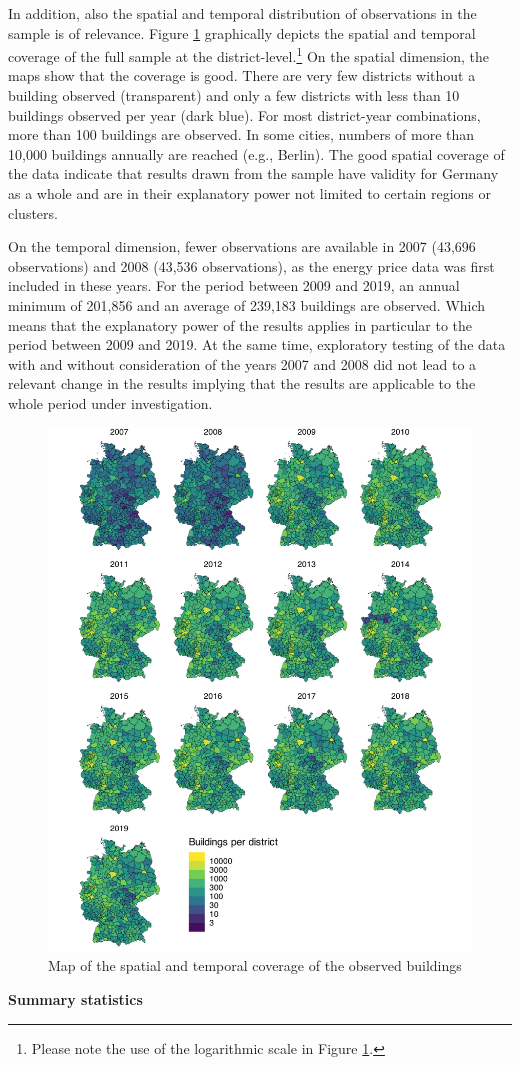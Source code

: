 \documentclass[12pt,twoside]{reedthesis}
\begin{document}
In addition, also the spatial and temporal distribution of observations in the sample is of relevance. Figure \ref{fig:buildings-distribution} graphically depicts the spatial and temporal coverage of the full sample at the district-level.\footnote{Please note the use of the logarithmic scale in Figure \ref{fig:buildings-distribution}.} On the spatial dimension, the maps show that the coverage is good. There are very few districts without a building observed (transparent) and only a few districts with less than 10 buildings observed per year (dark blue). For most district-year combinations, more than 100 buildings are observed. In some cities, numbers of more than 10,000 buildings annually are reached (e.g., Berlin). The good spatial coverage of the data indicate that results drawn from the sample have validity for Germany as a whole and are in their explanatory power not limited to certain regions or clusters.

On the temporal dimension, fewer observations are available in 2007 (43,696 observations) and 2008 (43,536 observations), as the energy price data was first included in these years. For the period between 2009 and 2019, an annual minimum of 201,856 and an average of 239,183 buildings are observed. Which means that the explanatory power of the results applies in particular to the period between 2009 and 2019. At the same time, exploratory testing of the data with and without consideration of the years 2007 and 2008 did not lead to a relevant change in the results implying that the results are applicable to the whole period under investigation.
\begin{figure}

{\centering \includegraphics[width=0.77\linewidth]{figure/buildings_distribution} 

}

\caption{Map of the spatial and temporal coverage of the observed buildings}\label{fig:buildings-distribution}
\end{figure}
\textbf{Summary statistics}
\end{document}
